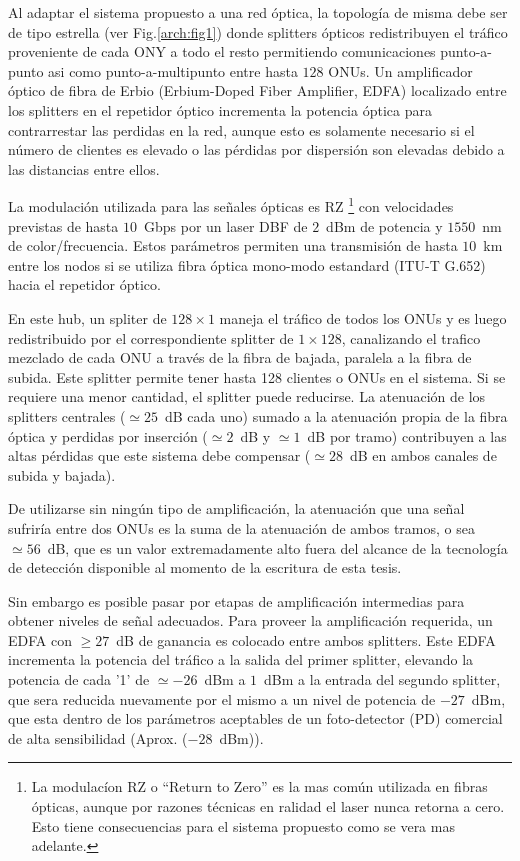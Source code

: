 Al adaptar el sistema propuesto a una red óptica, la topología de misma debe ser de tipo estrella (ver Fig.\ref{arch:fig1}) donde splitters ópticos redistribuyen el tráfico proveniente de cada ONY a todo el resto permitiendo comunicaciones punto-a-punto asi como punto-a-multipunto entre hasta $128$ ONUs.
Un amplificador óptico de fibra de Erbio (Erbium-Doped Fiber Amplifier, EDFA) localizado entre los splitters en el repetidor óptico incrementa la potencia óptica para contrarrestar las perdidas en la red, aunque esto es solamente necesario si el número de clientes es elevado o las pérdidas por dispersión son elevadas debido a las distancias entre ellos.

La modulación utilizada para las señales ópticas es RZ \footnote{La modulacíon RZ o ``Return to Zero'' es la mas común utilizada en fibras ópticas, aunque por razones técnicas en ralidad el laser nunca retorna a cero. Esto tiene consecuencias para el sistema propuesto como se vera mas adelante.} con velocidades previstas de hasta $10$~Gbps por un laser DBF de $2$~dBm de potencia y $1550$~nm de color/frecuencia. Estos parámetros permiten una transmisión de hasta $10$~km entre los nodos si se utiliza fibra óptica mono-modo estandard (ITU-T G.652) hacia el repetidor óptico.

En este hub, un spliter de $128\times 1$ maneja el tráfico de todos los ONUs y es luego redistribuido por el correspondiente splitter de $1\times 128$, canalizando el trafico mezclado de cada ONU a través de la fibra de bajada, paralela a la fibra de subida. Este splitter permite tener hasta 128 clientes o ONUs en el sistema. Si se requiere una menor cantidad, el splitter puede reducirse.
La atenuación de los splitters centrales ($\simeq25$~dB cada uno) sumado a la atenuación propia de la fibra óptica y perdidas por inserción ($\simeq2$~dB y $\simeq1$~dB por tramo) contribuyen a las altas pérdidas que este sistema debe compensar ($\simeq28$~dB en ambos canales de subida y bajada).

De utilizarse sin ningún tipo de amplificación, la atenuación que una señal sufriría entre dos ONUs es la suma de la atenuación de ambos tramos, o sea $\simeq56$~dB, que es un valor extremadamente alto fuera del alcance de la tecnología de detección disponible al momento de la escritura de esta tesis.

Sin embargo es posible pasar por etapas de amplificación intermedias para obtener niveles de señal adecuados. Para proveer la amplificación requerida, un EDFA con $\geq27$~dB de ganancia es colocado entre ambos splitters. Este EDFA incrementa la potencia del tráfico a la salida del primer splitter, elevando la potencia de cada '1' de $\simeq-26$~dBm a $1$~dBm a la entrada del segundo splitter, que sera reducida nuevamente por el mismo a un nivel de potencia de $-27$~dBm, que esta dentro de los parámetros aceptables de un foto-detector (PD) comercial de alta sensibilidad (Aprox. ($-28$~dBm)).

